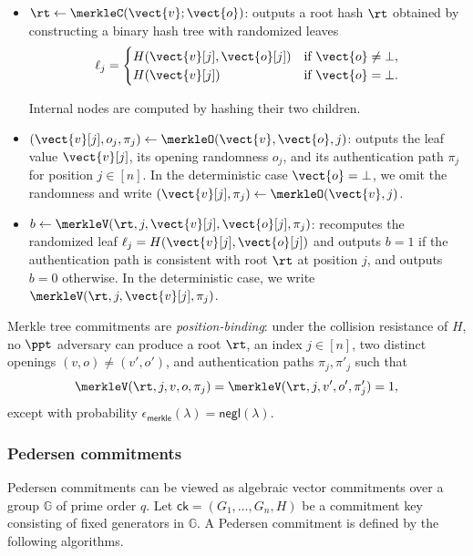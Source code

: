 \begin{itemize}
\item $\rt \gets \merkleC(\vect{v};\vect{o})$:
outputs a root hash $\rt$ obtained by constructing a binary hash tree with
randomized leaves
\[
\ell_j =
\begin{cases}
  H(\vect{v}[j], \vect{o}[j]) & \text{if } \vect{o}\neq\bot,\\
  H(\vect{v}[j]) & \text{if } \vect{o}=\bot.
\end{cases}
\]

Internal nodes are computed by hashing their two children.

\item $(\vect{v}[j],o_j,\pi_j) \gets \merkleO(\vect{v},\vect{o},j)$:
outputs the leaf value $\vect{v}[j]$, its opening randomness $o_j$, and its
authentication path $\pi_j$ for position $j\in[n]$.
In the deterministic case \(\vect{o}=\bot\), we omit the randomness and write
\((\vect{v}[j],\pi_j)\gets\merkleO(\vect{v},j)\).

\item $b \gets \merkleV(\rt,j,\vect{v}[j],\vect{o}[j],\pi_j)$:
recomputes the randomized leaf
$
  \ell_j = H(\vect{v}[j], \vect{o}[j])
$
and outputs $b=1$ if the authentication path is consistent with root $\rt$ at
position $j$, and outputs $b=0$ otherwise.
In the deterministic case, we write
\(\merkleV(\rt,j,\vect{v}[j],\pi_j)\).
\end{itemize}


Merkle tree commitments are \emph{position-binding}: under the collision
resistance of $H$, no $\ppt$ adversary can produce a root $\rt$, an index
$j\in[n]$, two distinct openings $(v,o)\neq(v',o')$, and authentication paths
$\pi_j,\pi'_j$ such that
\[
  \merkleV(\rt,j,v,o,\pi_j)
  =
  \merkleV(\rt,j,v',o',\pi'_j)
  =
  1,
\]
except with probability
$\epsilon_{\mathsf{merkle}}(\lambda)=\mathsf{negl}(\lambda)$.



\subsubsection{Pedersen commitments}
Pedersen commitments can be viewed as algebraic vector commitments over a group $\mathbb{G}$ of prime order $q$. Let $\mathsf{ck}=(G_1,\ldots,G_n,H)$ be a commitment key consisting of fixed generators in $\mathbb{G}$. A Pedersen commitment is defined by the following algorithms.

